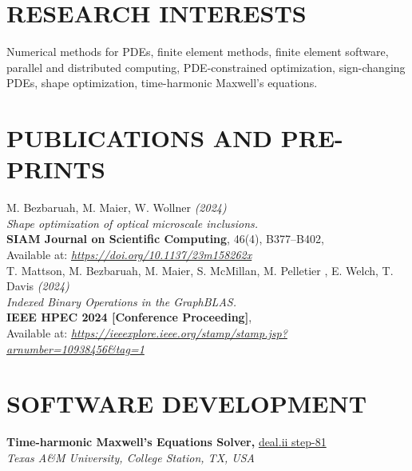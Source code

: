 \documentclass[10pt,a4paper,roman]{moderncv}
\begin{document}

\section{RESEARCH INTERESTS}
Numerical methods for PDEs, finite element methods, finite element software, 
parallel and distributed computing,
PDE-constrained optimization, sign-changing PDEs, shape optimization, 
time-harmonic Maxwell's equations.\\


\section{PUBLICATIONS AND PRE-PRINTS}
M. Bezbaruah, M. Maier, W. Wollner \textit{(2024)}\\
\textit{Shape optimization of optical microscale inclusions.}\\
\textbf{SIAM Journal on Scientific Computing}, 46(4), B377–B402,\\  
Available at: \href{https://doi.org/10.1137/23m158262x}{\textit{https://doi.org/10.1137/23m158262x}}\\

T. Mattson, M. Bezbaruah, M. Maier, S. McMillan, M. Pelletier , E. Welch, T. Davis \textit{(2024)}\\
\textit{Indexed Binary Operations in the GraphBLAS.}\\
\textbf{IEEE HPEC 2024 [Conference Proceeding]},\\ 
Available at: \href{https://ieeexplore.ieee.org/stamp/stamp.jsp?arnumber=10938456&tag=1}{\textit{https://ieeexplore.ieee.org/stamp/stamp.jsp?arnumber=10938456\&tag=1}}\\

\section{SOFTWARE DEVELOPMENT}
\textbf{Time-harmonic Maxwell's Equations Solver,}
\href{https://www.dealii.org/developer/doxygen/deal.II/step_81.html}
{deal.ii step-81}\\
\textit{Texas A\&M University, College Station, TX, USA}\\
\end{document}
